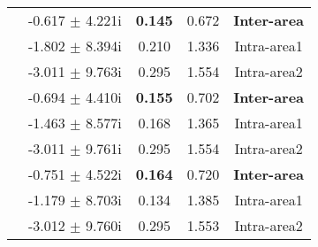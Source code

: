 \documentclass[conference,11pt]{IEEEtran}
\begin{document}
\begin{table}[t]
\begin{tabular}{||c|c|c|c|c||}
{}       &      {}     &         {} &      {}     &       {} \\ \hline
\hline
\multirow{3}{*}{\centering {10\%WG}}    & -0.617	$\pm$ 4.221i&	\bf{0.145}&	0.672 & \bf{Inter-area}\\ 
{}                           &              -1.802	$\pm$ 8.394i&	0.210&	1.336 & Intra-area1\\
{}                            &             -3.011	$\pm$ 9.763i&	0.295&	1.554 & Intra-area2\\ \hline
\multirow{3}{*}{\centering {25\%WG}}   & -0.694	$\pm$ 4.410i&	\bf{0.155}&	0.702 & \bf{Inter-area}\\ 
{}                            &            -1.463	$\pm$ 8.577i&	0.168&	1.365& Intra-area1\\
{}                           &             -3.011	$\pm$ 9.761i&	0.295&	1.554& Intra-area2\\ \hline
\multirow{3}{*}{\centering {35\%WG}}   & -0.751	$\pm$ 4.522i&	\bf{0.164}&	0.720 & \bf{Inter-area}\\
{}                           &          -1.179	$\pm$ 8.703i&	0.134&	1.385& Intra-area1\\
{}                           &          -3.012	$\pm$ 9.760i&	0.295&	1.553& Intra-area2\\ \hline \hline
\end{tabular}
\vspace{-0.20in}
\end{table}
\end{document}
